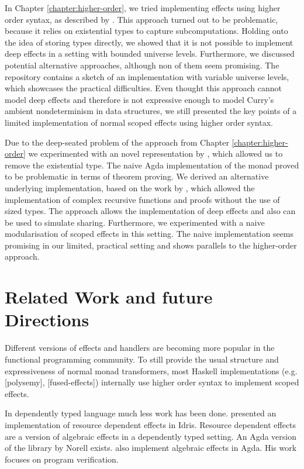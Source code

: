 \documentclass[10pt,a4paper,twoside,notitlepage]{report}
\begin{document}
In Chapter \ref{chapter:higher-order}, we tried implementing effects using higher
order syntax, as described by \textcite{DBLP:conf/haskell/WuSH14}.
This approach turned out to be problematic, because it relies on existential
types to capture subcomputations.
Holding onto the idea of storing types directly, we showed that it is not
possible to implement deep effects in a setting with bounded universe levels.
Furthermore, we discussed potential alternative approaches, although non of them
seem promising.
The repository contains a sketch of an implementation with variable universe
levels, which showcases the practical difficulties.
Even thought this approach cannot model deep effects and therefore is not
expressive enough to model Curry's ambient nondeterminism in data structures, we
still presented the key points of a limited implementation of normal scoped
effects using higher order syntax.

Due to the deep-seated problem of the approach from Chapter
\ref{chapter:higher-order} we experimented with an novel representation by
\textcite{DBLP:conf/lics/PirogSWJ18}, which allowed us to remove the existential
type.
The naive Agda implementation of the monad \textcite{DBLP:conf/lics/PirogSWJ18}
proved to be problematic in terms of theorem proving.
We derived an alternative underlying implementation, based on the work by
\textcite{DBLP:journals/corr/abs-1806-05230}, which allowed the implementation
of complex recursive functions and proofs without the use of sized types.
The approach allows the implementation of deep effects and also can be used to
simulate sharing.
Furthermore, we experimented with a naive modularisation of scoped effects in
this setting.
The naive implementation seems promising in our limited, practical
setting and shows parallels to the higher-order approach. %


\section{Related Work and future Directions}

Different versions of effects and handlers are becoming more popular in the
functional programming community.
To still provide the usual structure and expressiveness of normal monad
transformers, most Haskell implementations (e.g. [polysemy], [fused-effects])
internally use higher order syntax to implement scoped effects.

In dependently typed language much less work has been done.
\textcite{DBLP:conf/icfp/Brady13} presented an implementation of resource
dependent effects in Idris.
Resource dependent effects are a version of algebraic effects in a dependently
typed setting.
An Agda version of the library by Norell exists.
\textcite{baanen2019algebraic} also implement algebraic effects in Agda.
His work focuses on program verification.
\end{document}
